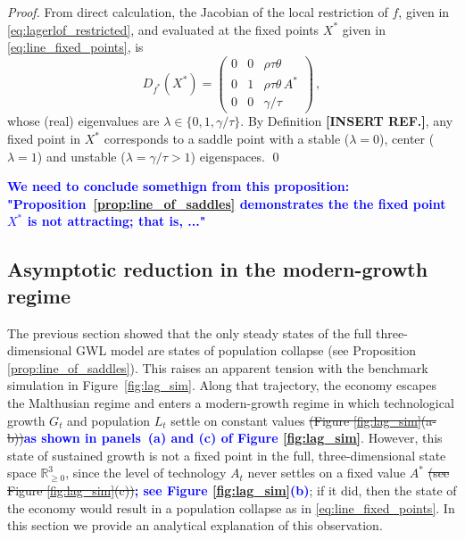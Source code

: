 \documentclass[a4paper,fleqn]{cas-sc}
\newcommand{\samb}[1]{\textcolor{blue}{\textbf{#1}}}
\begin{document}
%
\begin{proof}
    From direct calculation, the Jacobian of the local restriction of $f$, given in \eqref{eq:lagerlof_restricted}, and evaluated at the fixed points $X^*$ given in \eqref{eq:line_fixed_points}, is
    \begin{equation*}
        D_{f^*}(X^*)=\begin{pmatrix}
                        0 & 0 & \rho\tau\theta\\
                        0 & 1 & \rho\tau\theta\,A^* \\
                        0 & 0 & \gamma/\tau
                     \end{pmatrix}\,,
    \end{equation*}
    whose (real) eigenvalues are $\lambda\in\{0,1,\gamma/\tau\}$. 
    By Definition \textbf{[INSERT REF.]}, any fixed point in $X^*$ corresponds to a saddle point with a stable ($\lambda=0$), center ($\lambda=1$) and unstable ($\lambda=\gamma/\tau>1$) eigenspaces.
    \qed
\end{proof}
\samb{We need to conclude somethign from this proposition: "Proposition~\ref{prop:line_of_saddles} demonstrates the the fixed point $X^*$ is not attracting; that is, ..." }
\subsection{Asymptotic reduction in the modern-growth regime}\label{subsec:modern_growth_regime}
%
The previous section showed that the only steady states of the full three-dimensional GWL model are states of population collapse (see Proposition \ref{prop:line_of_saddles}). 
This raises an apparent tension with the benchmark simulation in Figure~\ref{fig:lag_sim}. 
Along that trajectory, the economy escapes the Malthusian regime and enters a modern-growth regime in which technological growth $G_t$ and population $L_t$ settle on constant values \sout{(Figure \ref{fig:lag_sim}(a-b))}\samb{as shown in panels~(a) and (c) of Figure \ref{fig:lag_sim}}.
However, this state of sustained growth is not a fixed point in the full, three-dimensional state space $\mathbb{R}^3_{\geq0}$, since the level of technology $A_t$ never settles on a fixed value $A^*$\sout{ (see Figure \ref{fig:lag_sim}(c))}\samb{; see Figure \ref{fig:lag_sim}(b)}; if it did, then the state of the economy would result in a population collapse as in \eqref{eq:line_fixed_points}.
In this section we provide an analytical explanation of this observation. 
\end{document}
